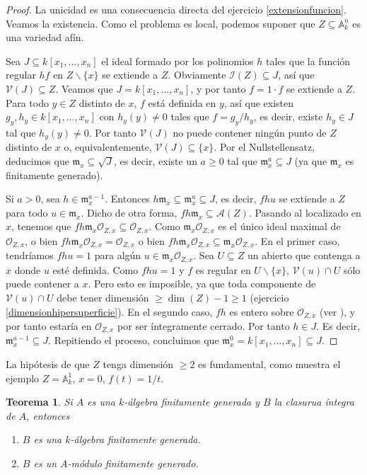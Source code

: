 \documentclass[a4paper,10pt]{book}
\newtheorem{thm}{Teorema}[chapter]
\newcommand{\AAA}{\mathbb A}
\newcommand{\Ank}{\AAA^n_k}
\newcommand{\calA}{{\mathcal A}}
\newcommand{\II}{{\mathcal I}}
\newcommand{\VV}{{\mathcal V}}
\newcommand{\mm}{{\mathfrak m}}
\begin{document}
\begin{proof}
 La unicidad es una consecuencia directa del ejercicio \ref{extensionfuncion}. Veamos la existencia. Como el problema es local, podemos suponer que $Z\subseteq\Ank$ es una variedad afín.

 Sea $J\subseteq k[x_1,\ldots,x_n]$ el ideal formado por los polinomios $h$ tales que la función regular $hf$ en $Z\backslash\{x\}$ se extiende a $Z$. Obviamente $\II(Z)\subseteq J$, así que $\VV(J)\subseteq Z$. Veamos que $J=k[x_1,\ldots,x_n]$, y por tanto $f=1\cdot f$ se extiende a $Z$. Para todo $y\in Z$ distinto de $x$, $f$ está definida en $y$, así que existen $g_y,h_y\in k[x_1,\ldots,x_n]$ con $h_y(y)\neq 0$ tales que $f=g_y/h_y$, es decir, existe $h_y\in J$ tal que $h_y(y)\neq 0$. Por tanto $\VV(J)$ no puede contener ningún punto de $Z$ distinto de $x$ o, equivalentemente, $\VV(J)\subseteq\{x\}$. Por el Nullstellensatz, deducimos que $\mm_x\subseteq\sqrt{J}$, es decir, existe un $a\geq 0$ tal que $\mm_x^a\subseteq J$ (ya que $\mm_x$ es finitamente generado).

Si $a>0$, sea $h\in\mm_x^{a-1}$. Entonces $h\mm_x\subseteq\mm_x^a\subseteq J$, es decir, $fhu$ se extiende a $Z$ para todo $u\in\mm_x$. Dicho de otra forma, $fh\mm_x\subseteq\calA(Z)$. Pasando al localizado en $x$, tenemos que $fh\mm_x{\mathcal O}_{Z,x}\subseteq{\mathcal O}_{Z,x}$. Como $\mm_x{\mathcal O}_{Z,x}$ es el único ideal maximal de ${\mathcal O}_{Z,x}$, o bien $fh\mm_x{\mathcal O}_{Z,x}={\mathcal O}_{Z,x}$ o bien $fh\mm_x{\mathcal O}_{Z,x}\subseteq\mm_x{\mathcal O}_{Z,x}$. En el primer caso, tendríamos $fhu=1$ para algún $u\in\mm_x{\mathcal O}_{Z,x}$. Sea $U\subseteq Z$ un abierto que contenga a $x$ donde $u$ esté definida. Como $fhu=1$ y $f$ es regular en $U\backslash\{x\}$, $\VV(u)\cap U$ sólo puede contener a $x$. Pero esto es imposible, ya que toda componente de $\VV(u)\cap U$ debe tener dimensión $\geq\dim(Z)-1\geq 1$ (ejercicio \ref{dimensionhipersuperficie}). En el segundo caso, $fh$ es entero sobre ${\mathcal O}_{Z,x}$ (ver \cite[Proposición 2.4]{am}), y por tanto estaría en ${\mathcal O}_{Z,x}$ por ser íntegramente cerrado. Por tanto $h\in J$. Es decir, $\mm_x^{a-1}\subseteq J$. Repitiendo el proceso, concluimos que $\mm_x^0=k[x_1,\ldots,x_n]\subseteq J$.
\end{proof}

La hipótesis de que $Z$ tenga dimensión $\geq 2$ es fundamental, como muestra el ejemplo $Z=\AAA^1_k$, $x=0$, $f(t)=1/t$.

\begin{thm}
Si $A$ es una $k$-álgebra finitamente generada y $B$ la clasurua íntegra de $A$, entonces
\begin{enumerate}
\item $B$ es una $k$-álgebra finitamente generada.
\item $B$ es un $A$-módulo finitamente generado.
\end{enumerate}
\end{thm}
\end{document}
